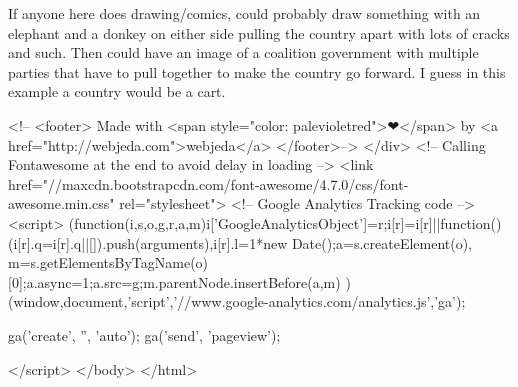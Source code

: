 If anyone here does drawing/comics, could probably draw something with an 
elephant and a donkey on either side pulling the country apart with lots of 
cracks and such.  Then could have an image of a coalition government with 
multiple parties that have to pull together to make the country go forward. 
I guess in this example a country would be a cart.


  
<!--    <footer>
      Made with <span style="color: palevioletred">❤</span> by <a href="http://webjeda.com">webjeda</a>
</footer>-->
</div>
  <!-- Calling Fontawesome at the end to avoid delay in loading --> 
  <link href="//maxcdn.bootstrapcdn.com/font-awesome/4.7.0/css/font-awesome.min.css" rel="stylesheet">
<!-- Google Analytics Tracking code -->
<script>
  (function(i,s,o,g,r,a,m){i['GoogleAnalyticsObject']=r;i[r]=i[r]||function(){
  (i[r].q=i[r].q||[]).push(arguments)},i[r].l=1*new Date();a=s.createElement(o),
  m=s.getElementsByTagName(o)[0];a.async=1;a.src=g;m.parentNode.insertBefore(a,m)
  })(window,document,'script','//www.google-analytics.com/analytics.js','ga');

  ga('create', '', 'auto');
  ga('send', 'pageview');

</script>
</body>
</html>
